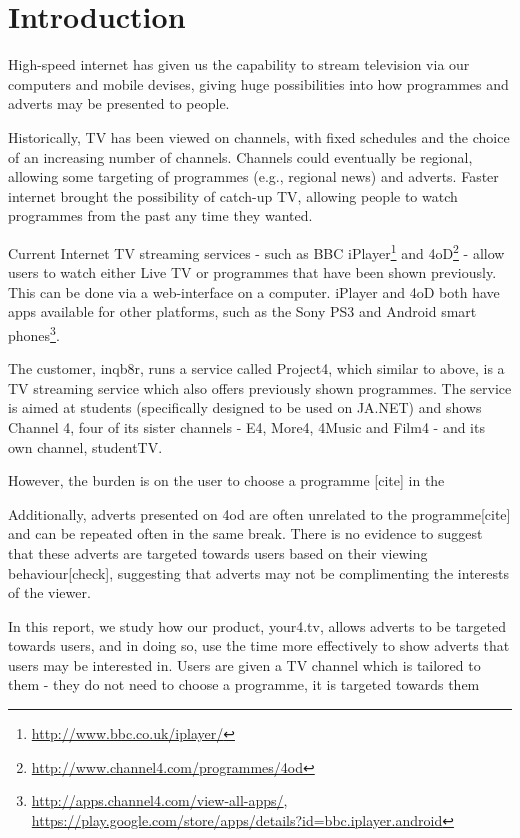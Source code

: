 \section{Introduction}
High-speed internet has given us the capability to stream television via our computers and mobile devises, giving huge possibilities into how programmes and adverts may be presented to people.

Historically, TV has been viewed on channels, with fixed schedules and the choice of an increasing number of channels. Channels could eventually be regional, allowing some targeting of programmes (e.g., regional news) and adverts. Faster internet brought the possibility of catch-up TV, allowing people to watch programmes from the past any time they wanted.

Current Internet TV streaming services - such as BBC iPlayer\footnote{\url{http://www.bbc.co.uk/iplayer/}} and 4oD\footnote{\url{http://www.channel4.com/programmes/4od}} - allow users to watch either Live TV or programmes that have been shown previously. This can be done via a web-interface on a computer. iPlayer and 4oD both have apps available for other platforms, such as the Sony PS3 and Android smart phones\footnote{\url{http://apps.channel4.com/view-all-apps/}, \url{https://play.google.com/store/apps/details?id=bbc.iplayer.android}}.

The customer, inqb8r, runs a service called Project4, which similar to above, is a TV streaming service which also offers previously shown programmes. The service is aimed at students (specifically designed to be used on JA.NET) and shows Channel 4, four of its sister channels - E4, More4, 4Music and Film4 - and its own channel, studentTV.

However, the burden is on the user to choose a programme [cite] in the

Additionally, adverts presented on 4od are often unrelated to the programme[cite] and can be repeated often in the same break. There is no evidence to suggest that these adverts are targeted towards users based on their viewing behaviour[check], suggesting that adverts may not be complimenting the interests of the viewer.

In this report, we study how our product, your4.tv, allows adverts to be targeted towards users, and in doing so, use the time more effectively to show adverts that users may be interested in. Users are given a TV channel which is tailored to them - they do not need to choose a programme, it is targeted towards them

